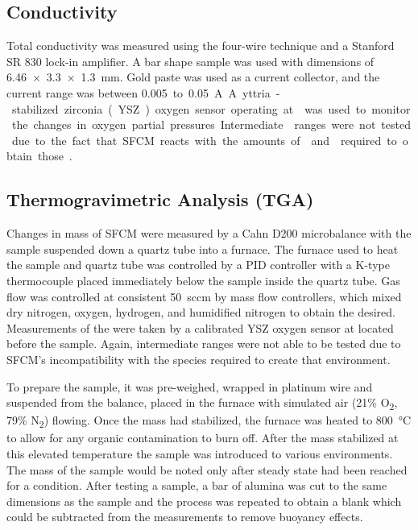     \subsection{Conductivity}
        Total conductivity was measured using the four-wire technique and a Stanford SR 830 lock-in amplifier.
        A bar shape sample was used with dimensions of \SI{6.46x3.3x1.3}{\milli\meter}.
        Gold paste was used as a current collector, and the current range was between \SI{0.005} to \SI{0.05}{A}.
        A yttria-stabilized zirconia (YSZ) oxygen sensor operating at  was used to monitor the changes in oxygen partial pressures.
        Intermediate  ranges were not tested due to the fact that SFCM reacts with the amounts of  and  required to obtain those .

    \subsection{Thermogravimetric Analysis (TGA)}
        Changes in mass of SFCM were measured by a Cahn D200 microbalance with the sample suspended down a quartz tube into a furnace.
        The furnace used to heat the sample and quartz tube was controlled by a PID controller with a K-type thermocouple placed immediately below the sample inside the quartz tube.
        Gas flow was controlled at consistent \SI{50}{sccm} by mass flow controllers, which mixed dry nitrogen, oxygen, hydrogen, and humidified nitrogen to obtain the  desired.
        Measurements of the  were taken by a calibrated YSZ oxygen sensor at  located before the sample.
        Again, intermediate  ranges were not able to be tested due to SFCM's incompatibility with the species required to create that environment.

        To prepare the sample, it was pre-weighed, wrapped in platinum wire and suspended from the balance, placed in the furnace with simulated air (21\% O\textsubscript{2}, 79\% N\textsubscript{2}) flowing.
        Once the mass had stabilized, the furnace was heated to \SI{800}{\celsius} to allow for any organic contamination to burn off.
        After the mass stabilized at this elevated temperature the sample was introduced to various environments.
        The mass of the sample would be noted only after steady state had been reached for a condition.
        After testing a sample, a bar of alumina was cut to the same dimensions as the sample and the process was repeated to obtain a blank which could be subtracted from the measurements to remove buoyancy effects.

